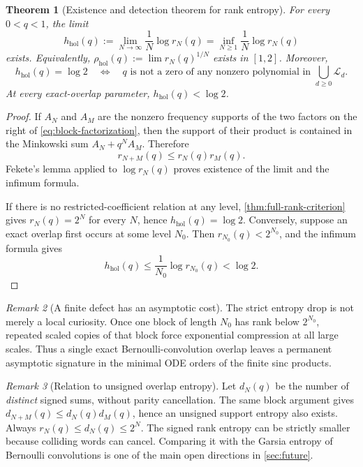 \documentclass[11pt]{article}
\numberwithin{equation}{section}
\newtheorem{theorem}{Theorem}[section]
\theoremstyle{definition}
\theoremstyle{remark}
\newtheorem{remark}[theorem]{Remark}
\begin{document}
\begin{theorem}[Existence and detection theorem for rank entropy]
\label{thm:rank-entropy}
For every $0<q<1$, the limit
\begin{equation}
 h_{\mathrm{hol}}(q):=
 \lim_{N\to\infty}\frac{1}{N}\log r_N(q)
 =\inf_{N\ge1}\frac{1}{N}\log r_N(q)
 \label{eq:holonomic-entropy}
\end{equation}
exists.  Equivalently,
$\rho_{\mathrm{hol}}(q):=\lim r_N(q)^{1/N}$ exists in $[1,2]$.
Moreover,
\begin{equation}
 \boxed{
 h_{\mathrm{hol}}(q)=\log2
 \quad\Longleftrightarrow\quad
 q\text{ is not a zero of any nonzero polynomial in }
 \bigcup_{d\ge0}\mathscr L_d.}
 \label{eq:entropy-detects-overlap}
\end{equation}
At every exact-overlap parameter, $h_{\mathrm{hol}}(q)<\log2$.
\end{theorem}
\begin{proof}
If $A_N$ and $A_M$ are the nonzero frequency supports of the two factors on
the right of \eqref{eq:block-factorization}, then the support of their product
is contained in the Minkowski sum $A_N+q^NA_M$.  Therefore
\begin{equation}
 r_{N+M}(q)\le r_N(q)r_M(q).
 \label{eq:rank-submultiplicative}
\end{equation}
Fekete's lemma applied to $\log r_N(q)$ proves existence of the limit and the
infimum formula.

If there is no restricted-coefficient relation at any level,
\cref{thm:full-rank-criterion} gives $r_N(q)=2^N$ for every $N$, hence
$h_{\mathrm{hol}}(q)=\log2$.  Conversely, suppose an exact overlap first occurs
at some level $N_0$.  Then $r_{N_0}(q)<2^{N_0}$, and the infimum formula gives
\[
 h_{\mathrm{hol}}(q)
 \le\frac{1}{N_0}\log r_{N_0}(q)<\log2.
\]
\end{proof}

\begin{remark}[A finite defect has an asymptotic cost]
The strict entropy drop is not merely a local curiosity.  Once one block of
length $N_0$ has rank below $2^{N_0}$, repeated scaled copies of that block
force exponential compression at all large scales.  Thus a single exact
Bernoulli-convolution overlap leaves a permanent asymptotic signature in the
minimal ODE orders of the finite sinc products.
\end{remark}

\begin{remark}[Relation to unsigned overlap entropy]
Let $d_N(q)$ be the number of \emph{distinct} signed sums, without parity
cancellation.  The same block argument gives
$d_{N+M}(q)\le d_N(q)d_M(q)$, hence an unsigned support entropy also exists.
Always $r_N(q)\le d_N(q)\le2^N$.  The signed rank entropy can be strictly
smaller because colliding words can cancel.  Comparing it with the Garsia
entropy of Bernoulli convolutions is one of the main open directions in
\cref{sec:future}.
\end{remark}
\end{document}
